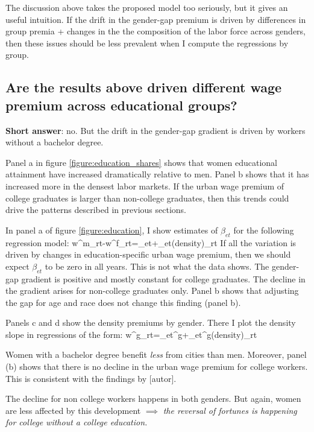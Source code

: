 	The discussion above takes the proposed model too seriously, but it gives an useful intuition. If the drift in the gender-gap premium is driven by differences in group premia + changes in the the composition of the labor force across genders, then these issues should be less prevalent when I compute the regressions by group.
\eitem 


\subsection{Are the results above driven different wage premium across educational groups?}

\noindent\textbf{Short answer}: no. But the drift in the gender-gap gradient is driven by workers without a bachelor degree.

Panel a in figure \ref{figure:education_shares} shows that women educational attainment have increased dramatically relative to men. Panel b shows that it has increased more in the densest labor markets. If the urban wage premium of college graduates is larger than non-college graduates, then this trends could drive the patterns described in previous sections.





In panel a of figure \ref{figure:education}, I show estimates of $\beta_{et}$ for the following regression model:
\beqns
w^m_{rt}-w^f_{rt}=\alpha_{et}+\beta_{et}\ln(density)_{rt}
\eeqns
If all the variation is driven by changes in education-specific urban wage premium, then we should expect $\beta_{et}$ to be zero in all years. This is not what the data shows. The gender-gap gradient is positive and mostly constant for college graduates. The decline in the gradient arises for non-college graduates only. Panel b shows that adjusting the gap for age and race does not change this finding (panel b).


Panels c and d show the density premiums by gender. There I plot the density slope in regressions of the form:
\beqns 
	w^g_{rt}=\alpha_{et}^g+\beta_{et}^g\ln(density)_{rt}
\eeqns

\bitem
	\item Women with a bachelor degree benefit \textit{less} from cities than men. Moreover, panel (b) shows that there is no decline in the urban wage premium for college workers. This is consistent with the findings by [autor].
	\item The decline for non college workers happens in both genders. But again, women are less affected by this development $\implies$ \textit{the reversal of fortunes is happening for college without a college education.}
\eitem 

